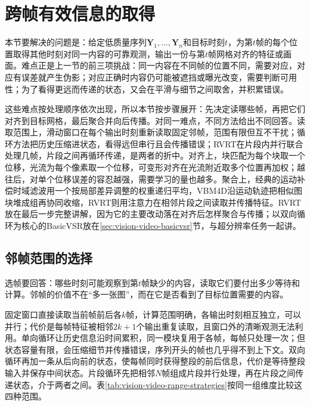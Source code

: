 \section{跨帧有效信息的取得}
\label{sec:vision-video-information-fusion}

本节要解决的问题是：给定低质量序列$\bm{Y}_1,\dots,\bm{Y}_n$和目标时刻$t$，为第$t$帧的每个位置取得其他时刻对同一内容的可靠观测，输出一份与第$t$帧网格对齐的特征或画面。难点正是上一节的前三项挑战：同一内容在不同帧的位置不同，需要对应，对应有误差就产生伪影；对应正确时内容仍可能被遮挡或曝光改变，需要判断可用性；为了看得更远而传递的状态，又会在平滑与细节之间取舍，并积累错误。

这些难点按处理顺序依次出现，所以本节按步骤展开：先决定读哪些帧，再把它们对齐到目标网格，最后聚合并向后传播。对同一难点，不同方法给出不同回答。读取范围上，滑动窗口在每个输出时刻重新读取固定邻帧，范围有限但互不干扰；循环方法把历史压缩进状态，看得远但串行且会传播错误；RVRT在片段内并行联合处理几帧，片段之间再循环传递，是两者的折中。对齐上，块匹配为每个块取一个位移，光流为每个像素取一个位移，可变形对齐在光流附近取多个位置再加权；越往后，对单个位移误差的容忍越强，需要学习的量也越多。聚合上，经典的运动补偿时域滤波用一个按局部差异调整的权重递归平均，VBM4D沿运动轨迹把相似图块堆成组再协同收缩，RVRT则用注意力在相邻片段之间读取并传播特征。RVRT放在最后一步完整讲解，因为它的主要改动落在对齐后怎样聚合与传播；以双向循环为核心的BasicVSR放在\ref{sec:vision-video-basicvsr}节，与超分辨率任务一起讲。

\subsection{邻帧范围的选择}
\label{sec:vision-video-neighbor-selection}

选帧要回答：哪些时刻可能观察到第$t$帧缺少的内容，读取它们要付出多少等待和计算。邻帧的价值不在“多一张图”，而在它是否看到了目标位置需要的内容。

固定窗口直接读取当前帧前后各$k$帧，计算范围明确，各输出时刻相互独立，可以并行；代价是每帧特征被相邻$2k+1$个输出重复读取，且窗口外的清晰观测无法利用。单向循环让历史信息沿时间累积，同一模块复用于各帧，每帧只处理一次；但状态容量有限，会压缩细节并传播错误，序列开头的帧也几乎得不到上下文。双向循环再加一条从后向前的状态，使每帧同时获得整段的前后信息，代价是等待整段输入并保存中间状态。片段循环先把相邻$N$帧组成片段并行处理，再在片段之间传递状态，介于两者之间。表\ref{tab:vision-video-range-strategies}按同一组维度比较这四种范围。

